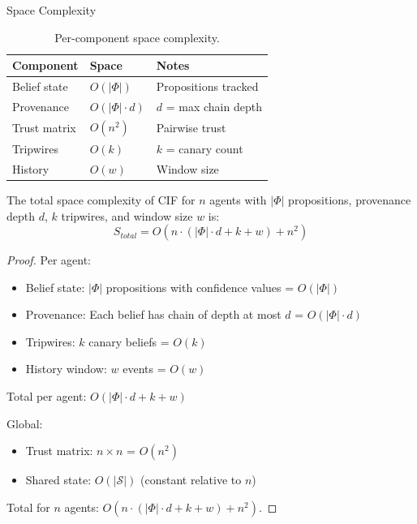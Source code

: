 \documentclass[
  ignorenonframetext,
]{beamer}
\begin{document}
\begin{frame}[allowframebreaks]{Space Complexity}
\begin{table}[htbp]
\centering
\caption{Per-component space complexity.}
\label{tab:space-components}
\begin{tabular}{@{}lll@{}}
\toprule
Component & Space & Notes \\
\midrule
Belief state & $O(|\Phi|)$ & Propositions tracked \\
Provenance & $O(|\Phi| \cdot d)$ & $d$ = max chain depth \\
Trust matrix & $O(n^2)$ & Pairwise trust \\
Tripwires & $O(k)$ & $k$ = canary count \\
History & $O(w)$ & Window size \\
\bottomrule
\end{tabular}
\end{table}

\begin{theorem}
\label{thm:space-bound}
The total space complexity of CIF for $n$ agents with $|\Phi|$ propositions, provenance depth $d$, $k$ tripwires, and window size $w$ is:
\begin{equation}
\label{eq:total-space}
S_{total} = O(n \cdot (|\Phi| \cdot d + k + w) + n^2)
\end{equation}
\end{theorem}

\begin{proof}
Per agent:
\begin{itemize}
\item Belief state: $|\Phi|$ propositions with confidence values = $O(|\Phi|)$
\item Provenance: Each belief has chain of depth at most $d$ = $O(|\Phi| \cdot d)$
\item Tripwires: $k$ canary beliefs = $O(k)$
\item History window: $w$ events = $O(w)$
\end{itemize}

Total per agent: $O(|\Phi| \cdot d + k + w)$

Global:
\begin{itemize}
\item Trust matrix: $n \times n$ = $O(n^2)$
\item Shared state: $O(|\mathcal{S}|)$ (constant relative to $n$)
\end{itemize}

Total for $n$ agents: $O(n \cdot (|\Phi| \cdot d + k + w) + n^2)$.
\end{proof}
\end{frame}
\end{document}

